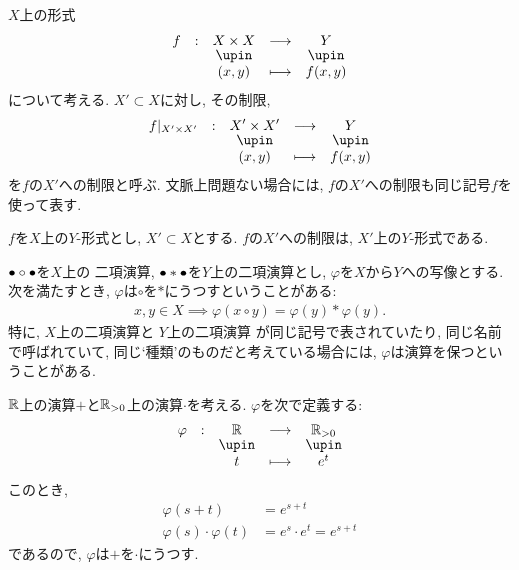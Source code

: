 \begin{definition}
  $X$上の形式
  \begin{align*}
    \shazo{f}
          {X\times X}{Y}
          {(x,y)}{f(x,y)}
  \end{align*}
  について考える.
  $X'\subset X$に対し,
  その制限,
  \begin{align*}
    \shazo{f|_{X'\times X'}}
          {X'\times X'}{Y}
          {(x,y)}{f(x,y)}
  \end{align*}
  を$f$の$X'$への制限と呼ぶ.
  文脈上問題ない場合には,
  $f$の$X'$への制限も同じ記号$f$を使って表す.
\end{definition}
\begin{remark}
  $f$を$X$上の$Y$-形式とし,
  $X'\subset X$とする.
  $f$の$X'$への制限は,
  $X'$上の$Y$-形式である.
\end{remark}

\begin{definition}
  ${\bullet}\circ {\bullet}$を$X$上の
  二項演算,
  ${\bullet}\ast {\bullet}$を$Y$上の二項演算とし,
  $\varphi$を$X$から$Y$への写像とする.
  次を満たすとき, $\varphi$は$\circ$を$\ast$にうつすということがある:
  \begin{align*}
    x,y\in X \implies \varphi(x\circ y)=\varphi(y) \ast \varphi(y) .
  \end{align*}
  特に,
  $X$上の二項演算と
  $Y$上の二項演算
  が同じ記号で表されていたり,
  同じ名前で呼ばれていて,
  同じ`種類'のものだと考えている場合には,
  $\varphi$は演算を保つということがある.
\end{definition}


\begin{example}
  $\mathbb{R}$上の演算$+$と$\mathbb{R}_{>0}$上の演算$\cdot$を考える.
  $\varphi$を次で定義する:
  \begin{align*}
    \shazo{\varphi}{\RR}{\RR_{>0}}
    {t}{e^t}
  \end{align*}
  このとき,
  \begin{align*}
    \varphi(s+t)&=e^{s+t}\\
    \varphi(s)\cdot\varphi(t)&=e^{s}\cdot e^{t}=e^{s+t}
  \end{align*}
  であるので, $\varphi$は$+$を$\cdot$にうつす.
\end{example}

